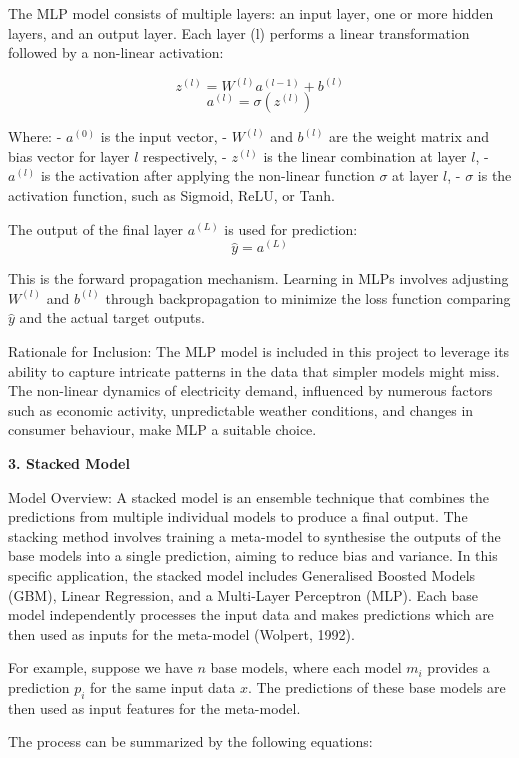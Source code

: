 \documentclass[mstat,12pt]{unswthesis}
\begin{document}
The MLP model consists of multiple layers: an input layer, one or more
hidden layers, and an output layer. Each layer (l) performs a linear
transformation followed by a non-linear activation:

\[ z^{(l)} = W^{(l)}a^{(l-1)} + b^{(l)} \]
\[ a^{(l)} = \sigma(z^{(l)}) \]

Where: - \(a^{(0)}\) is the input vector, - \(W^{(l)}\) and \(b^{(l)}\)
are the weight matrix and bias vector for layer \(l\) respectively, -
\(z^{(l)}\) is the linear combination at layer \(l\), - \(a^{(l)}\) is
the activation after applying the non-linear function \(\sigma\) at
layer \(l\), - \(\sigma\) is the activation function, such as Sigmoid,
ReLU, or Tanh.

The output of the final layer \(a^{(L)}\) is used for prediction:
\[ \hat{y} = a^{(L)} \]

This is the forward propagation mechanism. Learning in MLPs involves
adjusting \(W^{(l)}\) and \(b^{(l)}\) through backpropagation to
minimize the loss function comparing \(\hat{y}\) and the actual target
outputs.

Rationale for Inclusion: The MLP model is included in this project to
leverage its ability to capture intricate patterns in the data that
simpler models might miss. The non-linear dynamics of electricity
demand, influenced by numerous factors such as economic activity,
unpredictable weather conditions, and changes in consumer behaviour,
make MLP a suitable choice.

\textbf{3. Stacked Model}

Model Overview: A stacked model is an ensemble technique that combines
the predictions from multiple individual models to produce a final
output. The stacking method involves training a meta-model to synthesise
the outputs of the base models into a single prediction, aiming to
reduce bias and variance. In this specific application, the stacked
model includes Generalised Boosted Models (GBM), Linear Regression, and
a Multi-Layer Perceptron (MLP). Each base model independently processes
the input data and makes predictions which are then used as inputs for
the meta-model (Wolpert, 1992).

For example, suppose we have \(n\) base models, where each model \(m_i\)
provides a prediction \(p_i\) for the same input data \(x\). The
predictions of these base models are then used as input features for the
meta-model.

The process can be summarized by the following equations:
\end{document}
